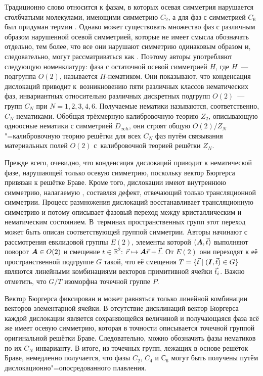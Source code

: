 \documentclass[a4paper, 14pt, titlepage]{extarticle}
\newcommand{\R}{\mathbb{R}}  %
\begin{document}
  Традиционно слово  относится к фазам, в которых осевая симметрия нарушается
  столбчатыми молекулами, имеющими симметрию $C_2$, а для фаз с симметрией $C_6$ был придуман термин
  . Однако может существовать множество фаз с различным образом нарушенной осевой
  симметрией, которые не имеет смысла обозначать отдельно, тем более, что все они нарушают симметрию
  одинаковым образом и, следовательно, могут рассматриваться как . Поэтому авторы
  употребляют следующую номенклатуру: фаза с остаточной осевой симметрией $H$, где $H$~--- подгруппа
  $O(2)$, называется $H$-нематиком. Они показывают, что конденсация дислокаций приводит
  к~возникновению пяти различных классов нематических фаз, инвариантных относительно различных
  дискретных подгрупп $O(2)$~--- групп $C_N$ при $N = 1,2,3,4,6$. Получаемые нематики называются,
  соответственно, $C_N$-нематиками.  Обобщая трёхмерную калибровочную теорию $Z_2$, описывающую
  одноосные нематики с симметрией $D_{\infty h}$, они строят общую $O(2)/Z_N$"=калибровочную теорию
  решётки для всех $C_N$ фаз путём связывания материальных полей $O(2)$ с~калибровочной теорией
  решётки $Z_N$.

  Прежде всего, очевидно, что конденсация дислокаций приводит к нематической фазе, нарушающей только
  осевую симметрию, поскольку вектор Бюргерса привязан к решётке Браве. Кроме того, дислокации имеют
  внутреннюю симметрию, налагаемую , составляя дефект, отвечающий
  только трансляционной симметрии. Процесс размножения дислокаций восстанавливает трансляционную
  симметрию и потому описывает фазовый переход между кристаллическим и нематическим состоянием.
  В~терминах пространственных групп этот переход может быть описан соответствующей группой симметрии.
  Авторы начинают с рассмотрения евклидовой группы $E(2)$, элементы которой $(\bm{A},\vec{t})$
  выполняют поворот $\bm{A} \in O(2)$ и смещение $t \in \R^2$: $\vec{r} \mapsto \bm{A}\vec{r} + \vec{t}$.
  От $E(2)$ они переходят к её пространственной подгруппе $G$ такой, что её смещения
  $T = \{\vec{t} \mid (\bm{I},\vec{t}) \in G\}$ являются линейными комбинациями векторов
  примитивной ячейки $\vec{t}_i$. Важно отметить, что $G/T$ изоморфна точечной группе $P$.

  Вектор Бюргерса фиксирован и может равняться только линейной комбинации векторов элементарной
  ячейки. В отсутствие дисклинаций вектор Бюргерса каждой дислокации является сохраняющейся
  величиной и получающаяся фаза всё же имеет осевую симметрию, которая в точности описывается
  точечной группой оригинальной решётки Браве. Следовательно, можно обозначить фазы нематиков по их
  $C_N$ инварианту. В итоге, из точечных групп, лежащих в основе решёток Браве, немедленно
  получается, что фазы $C_2$, $C_4$ и $С_6$ могут быть получены путём дислокационно"=опосредованного плавления.
\end{document}
